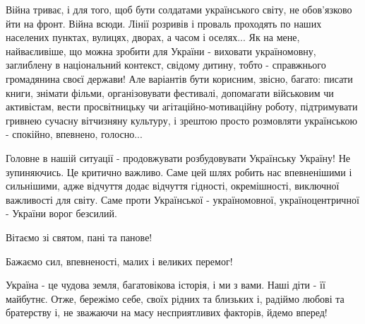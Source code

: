 Війна триває, і для того, щоб бути солдатами українського світу, не обов'язково
йти на фронт. Війна всюди. Лінії розривів і проваль проходять по наших
населених пунктах, вулицях, дворах, а часом і оселях... Як на мене,
найваєливіше, що можна зробити для України - виховати україномовну, заглиблену
в національний контекст, свідому дитину, тобто - справжнього громадянина своєї
держави! Але варіантів бути корисним, звісно, багато: писати книги, знімати
фільми, організовувати фестивалі, допомагати військовим чи активістам, вести
просвітницьку чи агітаційно-мотиваційну роботу, підтримувати гривнею сучасну
вітчизняну культуру, і зрештою просто розмовляти українською - спокійно,
впевнено, голосно...

Головне в нашій ситуації - продовжувати розбудовувати Українську Україну! Не
зупиняючись. Це критично важливо. Саме цей шлях робить нас впевненішими і
сильнішими, адже відчуття додає відчуття гідності, окремішності, виключної
важливості для світу. Саме проти Української - україномовної, україноцентричної
- України ворог безсилий.

Вітаємо зі святом, пані та панове!

Бажаємо сил, впевненості, малих і великих перемог!

Україна - це чудова земля, багатовікова історія, і ми з вами. Наші діти - її
майбутнє. Отже, бережімо себе, своїх рідних та близьких і, радіймо любові та
братерству і, не зважаючи на масу несприятливих факторів, йдемо вперед!
